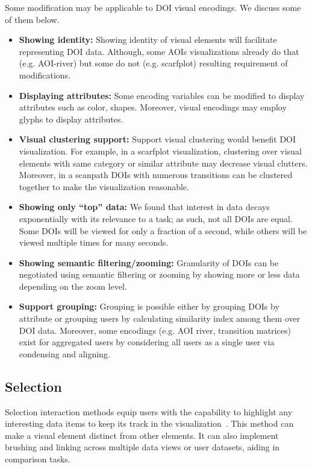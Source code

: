 Some modification may be applicable to DOI visual encodings. We discuss some of them below. 
\begin{itemize}
	\item \textbf{Showing identity:} Showing identity of visual elements will facilitate representing DOI data. Although, some AOIs visualizations already do that (e.g. AOI-river) but some do not (e.g. scarfplot) resulting requirement of modifications.
	\item \textbf{Displaying attributes:} Some encoding variables can be modified to display attributes such as color, shapes. Moreover, visual encodings may employ glyphs to display attributes.
	\item \textbf{Visual clustering support:} Support visual clustering would benefit DOI visualization. For example, in a scarfplot visualization, clustering over visual elements with same category or similar attribute may decrease visual clutters. Moreover, in a scanpath DOIs with numerous transitions can be clustered together to make the visualization reasonable. 
	\item \textbf{Showing only ``top'' data:} We found that interest in data decays exponentially with its relevance to a task; as such, not all DOIs are equal. Some DOIs will be viewed for only a fraction of a second, while others will be viewed multiple times for many seconds. 
	\item \textbf{Showing semantic filtering/zooming:} Granularity of DOIs can be negotiated using semantic filtering or zooming by showing more or less data depending on the zoom level.
	\item \textbf{Support grouping:} Grouping is possible either by grouping DOIs by attribute or grouping users by calculating similarity index among them over DOI data. Moreover, some encodings (e.g. AOI river, transition matrices) exist for aggregated users by considering all users as a single user via condensing and aligning. 
\end{itemize}

\subsection{Selection}
Selection interaction methods equip users with the capability to highlight any interesting data items to keep its track in the visualization~\cite{yi2007toward}. This method can make a visual element distinct from other elements. It can also implement brushing and linking across multiple data views or user datasets, aiding in comparison tasks. 

